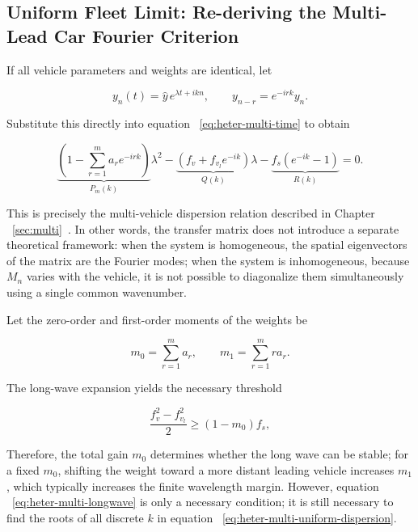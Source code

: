\documentclass[11pt,a4paper,openany]{book}
\numberwithin{equation}{chapter}
\numberwithin{figure}{chapter}
\numberwithin{table}{chapter}
\begin{document}
\subsection{Uniform Fleet Limit: Re-deriving the Multi-Lead Car Fourier Criterion}





If all vehicle parameters and weights are identical, let

\[
y_n(t)=\widehat y\,e^{\lambda t+ikn},
\qquad y_{n-r}=e^{-irk}y_n.
\]

Substitute this directly into equation ~\eqref{eq:heter-multi-time} to obtain

\begin{equation}
\underbrace{\left(1-\sum_{r=1}^{m}a_r e^{-irk}\right)}_{P_m(k)}\lambda^2
-\underbrace{\left(f_v+f_{v_l}e^{-ik}\right)}_{Q(k)}\lambda
-\underbrace{f_s\left(e^{-ik}-1\right)}_{R(k)}=0.
\label{eq:heter-multi-uniform-dispersion}
\end{equation}

This is precisely the multi-vehicle dispersion relation described in Chapter ~\ref{sec:multi}~. In other words, the transfer matrix does not introduce a separate theoretical framework: when the system is homogeneous, the spatial eigenvectors of the matrix are the Fourier modes; when the system is inhomogeneous, because $M_n$ varies with the vehicle, it is not possible to diagonalize them simultaneously using a single common wavenumber.




Let the zero-order and first-order moments of the weights be

\begin{equation}
m_0=\sum_{r=1}^{m}a_r,
\qquad
m_1=\sum_{r=1}^{m}r a_r.
\end{equation}

The long-wave expansion yields the necessary threshold

\begin{equation}
\frac{f_v^2-f_{v_l}^2}{2}\ge(1-m_0)f_s,
\label{eq:heter-multi-longwave}
\end{equation}

Therefore, the total gain $m_0$ determines whether the long wave can be stable; for a fixed $m_0$, shifting the weight toward a more distant leading vehicle increases $m_1$, which typically increases the finite wavelength margin. However, equation ~\eqref{eq:heter-multi-longwave} is only a necessary condition; it is still necessary to find the roots of all discrete $k$ in equation ~\eqref{eq:heter-multi-uniform-dispersion}.
\end{document}
